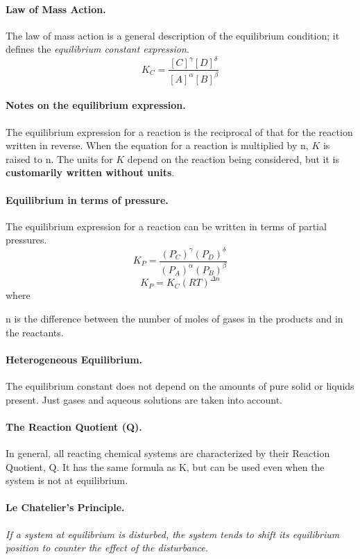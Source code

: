 \documentclass[oneside]{book}
\begin{document}
\paragraph{Law of Mass Action.} The law of mass action is a general description
of the equilibrium condition; it defines the \textit{equilibrium constant
expression}.
\[K_C = \frac{[C]^\gamma [D]^\delta}{[A]^\alpha [B]^\beta}\]

\paragraph{Notes on the equilibrium expression.} The equilibrium expression for
a reaction is the reciprocal of that for the reaction written in reverse. When
the equation for a reaction is multiplied by n, \(K\) is raised to n.  The
units for \(K\) depend on the reaction being considered, but it is
\textbf{customarily written without units}.

\paragraph{Equilibrium in terms of pressure.} The equilibrium expression for a
reaction can be written in terms of partial pressures.
\[K_P = \frac{\left(P_C\right)^\gamma
\left(P_D\right)^\delta}{\left(P_A\right)^\alpha \left(P_B\right)^\beta}\]
\[K_P = K_C (RT)^{\Delta n}\]
where

n is the difference between the number of moles of gases in the products and in
the reactants.

\paragraph{Heterogeneous Equilibrium.} The equilibrium constant does not depend
on the amounts of pure solid
or liquids present. Just gases and aqueous solutions are taken into account.

\paragraph{The Reaction Quotient (Q).} In general, all reacting chemical
systems are characterized by their Reaction Quotient, Q. It has the same
formula as K, but can be used even when the system is not at equilibrium.

\paragraph{Le Chatelier's Principle.} \textit{If a system at equilibrium is
disturbed, the system tends to shift its equilibrium position to counter the
effect of the disturbance.}
\end{document}
